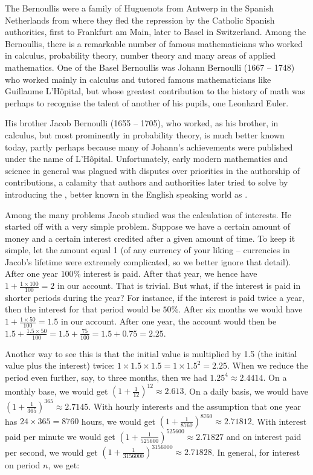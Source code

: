 \documentclass[tikz]{scrreprt}
\begin{document}
The Bernoullis were a family of Huguenots from Antwerp
in the Spanish Netherlands from where they fled the repression
by the Catholic Spanish authorities, first to Frankfurt am Main,
later to Basel in Switzerland. Among the Bernoullis,
there is a remarkable number of famous mathematicians
who worked in calculus,
probability theory, number theory and many areas 
of applied mathematics. One of the Basel Bernoullis was
Johann Bernoulli (1667 -- 1748) who worked mainly
in calculus and tutored famous mathematicians like 
Guillaume L'Hôpital, but whose greatest contribution
to the history of math was perhaps to recognise 
the talent of another of his pupils, one Leonhard Euler. 

His brother Jacob Bernoulli (1655 -- 1705),
who worked, as his brother, in calculus, but
most prominently in probability theory, 
is much better known today, partly perhaps
because many of Johann's achievements 
were published under the name of L'Hôpital.
Unfortunately, early modern mathematics 
and science in general was
plagued with disputes over priorities in the
authorship of contributions, a calamity
that authors and authorities later tried to
solve by introducing the ,
better known in the English speaking world as
.

Among the many problems Jacob studied was
the calculation of interests. He started off
with a very simple problem. Suppose we have
a certain amount of money and a certain interest
credited after a given amount of time. To keep it
simple, let the amount equal 1 (of any currency
of your liking -- currencies in Jacob's lifetime
were extremely complicated, so we better ignore
that detail). After one year $100\%$ interest is paid.
After that year, we hence have $1+\frac{1\times 100}{100} = 2$ 
in our account. That is trivial.
But what, if the interest is paid in shorter periods
during the year?
For instance, if the interest is paid twice a year,
then the interest for that period would be $50\%$.
After six months we would have $1+\frac{1\times 50}{100} = 1.5$
in our account. After one year, the account would then be
$1.5 + \frac{1.5\times 50}{100} = 1.5 + \frac{75}{100} = 1.5 + 0.75 = 2.25$.

Another way to see this is that the initial value 
is multiplied by 1.5 (the initial value plus the interest) twice:
$1 \times 1.5 \times 1.5 = 1 \times 1.5^2 = 2.25$.
When we reduce the period even further, say, to three months,
then we had $1.25^4 \approx 2.4414$. On a monthly base,
we would get $\left(1+\frac{1}{12}\right)^{12} \approx 2.613$.
On a daily basis, we would have 
$\left(1+\frac{1}{365}\right)^{365} \approx 2.7145$.
With hourly interests and the assumption
that one year has $24 \times 365 = 8760$ hours, 
we would get $\left(1+\frac{1}{8760}\right)^{8760} \approx 2.71812$.
With interest paid per minute we would get
$\left(1+\frac{1}{525600}\right)^{525600} \approx 2.71827$ and
on interest paid per second, we would get
$\left(1+\frac{1}{3156000}\right)^{3156000} \approx 2.71828$.
In general, for interest on period $n$, we get:
\end{document}
